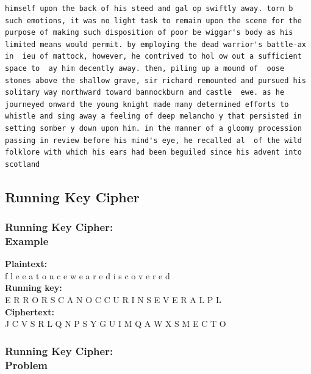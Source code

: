 \documentclass{uva-inf-presentation}
\begin{document}
\begin{frame}[containsverbatim]
\begin{lstlisting}
himself upon the back of his steed and gal op swiftly away. torn b  such emotions, it was no light task to remain upon the scene for the purpose of making such disposition of poor be wiggar's body as his limited means would permit. by employing the dead warrior's battle-ax in  ieu of mattock, however, he contrived to hol ow out a sufficient space to  ay him decently away. then, piling up a mound of  oose stones above the shallow grave, sir richard remounted and pursued his solitary way northward toward bannockburn and castle  ewe. as he journeyed onward the young knight made many determined efforts to whistle and sing away a feeling of deep melancho y that persisted in setting somber y down upon him. in the manner of a gloomy procession passing in review before his mind's eye, he recalled al  of the wild folklore with which his ears had been beguiled since his advent into scotland
\end{lstlisting}
\end{frame}

\subsection{Running Key Cipher}
\frame{\tableofcontents[currentsubsection]}

\begin{frame}
\frametitle{Running Key Cipher:\\ Example}

\textbf{Plaintext:}\\
f   l   e   e   a   t   o   n   c   e   w   e   a   r   e   d   i   s   c   o   v   e   r   e   d\\
\textbf{Running key:}\\
E   R   R   O   R   S   C   A   N   O   C   C   U   R   I   N   S   E   V   E   R   A   L   P   L\\
\textbf{Ciphertext:}\\
J   C   V   S   R   L   Q   N   P   S   Y   G   U   I   M   Q   A   W   X   S   M   E   C   T   O\\
\end{frame}

\begin{frame}
\frametitle{Running Key Cipher:\\ Problem}
\vspace{-30pt}

\end{frame}
\end{document}
